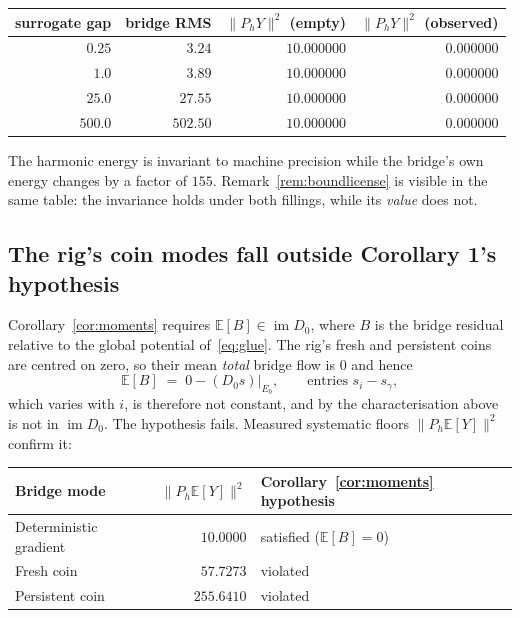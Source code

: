 \documentclass[11pt,a4paper]{article}
\theoremstyle{definition}
\theoremstyle{remark}
\newcommand{\im}{\operatorname{im}}
\newcommand{\Ph}{P_h}
\begin{document}
\begin{center}
\small
\begin{tabular}{@{}rrrr@{}}
\toprule
surrogate gap & bridge RMS & $\|\Ph Y\|^2$ (empty) & $\|\Ph Y\|^2$ (observed) \\
\midrule
$0.25$ & $3.24$   & $10.000000$ & $0.000000$ \\
$1.0$  & $3.89$   & $10.000000$ & $0.000000$ \\
$25.0$ & $27.55$  & $10.000000$ & $0.000000$ \\
$500.0$& $502.50$ & $10.000000$ & $0.000000$ \\
\bottomrule
\end{tabular}
\end{center}

The harmonic energy is invariant to machine precision while the bridge's own
energy changes by a factor of $155$. Remark~\ref{rem:boundlicense} is visible in the same table: the
invariance holds under both fillings, while its \emph{value} does not.

\subsection{The rig's coin modes fall outside Corollary 1's hypothesis}
\label{subsec:hypothesis}

Corollary~\ref{cor:moments} requires $\mathbb{E}[B]\in\im D_0$, where $B$ is the bridge residual
relative to the global potential of~\eqref{eq:glue}. The rig's fresh and persistent coins are
centred on zero, so their mean \emph{total} bridge flow is $0$ and hence
\[
\mathbb{E}[B] \;=\; 0-(D_0s)\big|_{E_b},
\qquad\text{entries } s_i-s_\gamma,
\]
which varies with $i$, is therefore not constant, and by the characterisation
above is not in $\im D_0$. The hypothesis fails. Measured systematic floors
$\|\Ph\mathbb{E}[Y]\|^2$ confirm it:

\begin{center}
\small
\begin{tabular}{@{}lrl@{}}
\toprule
Bridge mode & $\|\Ph\mathbb{E}[Y]\|^2$ & Corollary~\ref{cor:moments} hypothesis \\
\midrule
Deterministic gradient & $10.0000$  & satisfied ($\mathbb{E}[B]=0$) \\
Fresh coin             & $57.7273$  & violated \\
Persistent coin        & $255.6410$ & violated \\
\bottomrule
\end{tabular}
\end{center}
\end{document}
